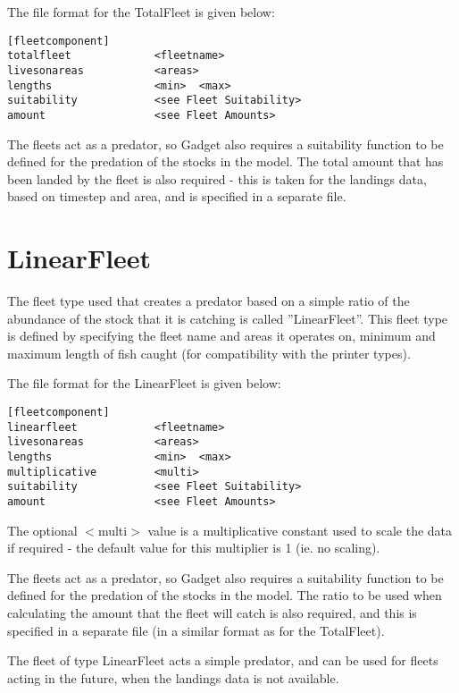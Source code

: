 \documentclass [a4paper, 10pt]{book}
\begin{document}
\bigskip
The file format for the TotalFleet is given below:

{\small\begin{verbatim}
[fleetcomponent]
totalfleet             <fleetname>
livesonareas           <areas>
lengths                <min>  <max>
suitability            <see Fleet Suitability>
amount                 <see Fleet Amounts>
\end{verbatim}}

The fleets act as a predator, so Gadget also requires a suitability function to be defined for the predation of the stocks in the model.  The total amount that has been landed by the fleet is also required - this is taken for the landings data, based on timestep and area, and is specified in a separate file.

\section{LinearFleet}\label{sec:linearfleet}
The fleet type used that creates a predator based on a simple ratio of the abundance of the stock that it is catching is called ''LinearFleet''.  This fleet type is defined by specifying the fleet name and areas it operates on, minimum and maximum length of fish caught (for compatibility with the printer types).

\bigskip
The file format for the LinearFleet is given below:

{\small\begin{verbatim}
[fleetcomponent]
linearfleet            <fleetname>
livesonareas           <areas>
lengths                <min>  <max>
multiplicative         <multi>
suitability            <see Fleet Suitability>
amount                 <see Fleet Amounts>
\end{verbatim}}

The optional $<$multi$>$ value is a multiplicative constant used to scale the data if required - the default value for this multiplier is 1 (ie. no scaling).

\bigskip
The fleets act as a predator, so Gadget also requires a suitability function to be defined for the predation of the stocks in the model.  The ratio to be used when calculating the amount that the fleet will catch is also required, and this is specified in a separate file (in a similar format as for the TotalFleet).

\bigskip
The fleet of type LinearFleet acts a simple predator, and can be used for fleets acting in the future, when the landings data is not available.
\end{document}
